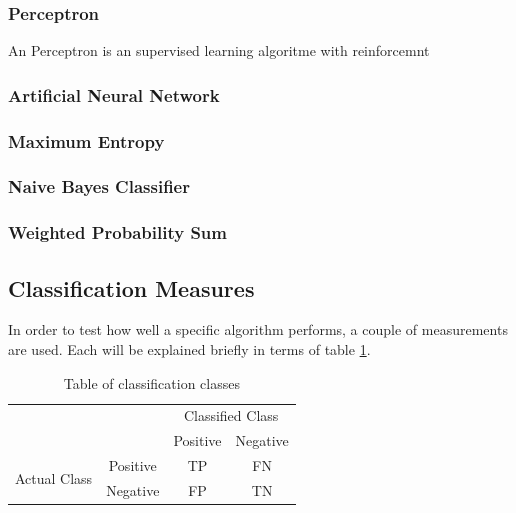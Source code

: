 \documentclass[11pt]{article}
\begin{document}

\subsubsection{Perceptron}

An Perceptron is an supervised learning algoritme with reinforcemnt 


\subsubsection{Artificial Neural Network}

\subsubsection{Maximum Entropy}

\subsubsection{Naive Bayes Classifier}

\subsubsection{Weighted Probability Sum}

\subsection{Classification Measures}

In order to test how well a specific algorithm performs, a couple of measurements are used. Each will be explained briefly in terms of table \ref{classification}.

\begin{table}[h]
\center
\begin{tabular}{cc|c|c|}
\cline{3-4}
& & \multicolumn{2}{|c|}{Classified Class} \\ \cline{3-4}
& &  Positive & Negative \\ \cline{1-4}
\multicolumn{1}{|c|}{\multirow{2}{*}{Actual Class}} &
\multicolumn{1}{|c|}{Positive} &  TP & FN      \\ \cline{2-4}
\multicolumn{1}{|c|}{}                        &
\multicolumn{1}{|c|}{Negative} & FP & TN     \\ \cline{1-4}
\end{tabular}
\caption{Table of classification classes}
\label{classification}
\end{table} 
\end{document}

